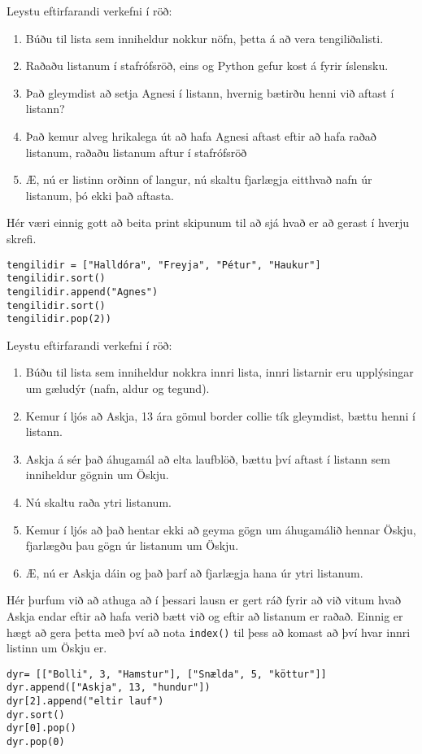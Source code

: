 \begin{exercise}\label{lst6}
Leystu eftirfarandi verkefni í röð:
\begin{enumerate}
	\item Búðu til lista sem inniheldur nokkur nöfn, þetta á að vera tengiliðalisti.
	\item Raðaðu listanum í stafrófsröð, eins og Python gefur kost á fyrir íslensku.
	\item Það gleymdist að setja Agnesi í listann, hvernig bætirðu henni við aftast í listann?
	\item Það kemur alveg hrikalega út að hafa Agnesi aftast eftir að hafa raðað listanum, raðaðu listanum aftur í stafrófsröð
	\item Æ, nú er listinn orðinn of langur, nú skaltu fjarlægja eitthvað nafn úr listanum, þó ekki það aftasta.
\end{enumerate}
\end{exercise}
\begin{Answer}[ref={lst6}]
Hér væri einnig gott að beita print skipunum til að sjá hvað er að gerast í hverju skrefi.
\begin{lstlisting}
tengilidir = ["Halldóra", "Freyja", "Pétur", "Haukur"]
tengilidir.sort()
tengilidir.append("Agnes")
tengilidir.sort()
tengilidir.pop(2))\end{lstlisting}
\end{Answer}

\begin{exercise}\label{lst7}
Leystu eftirfarandi verkefni í röð:
\begin{enumerate}
	\item Búðu til lista sem inniheldur nokkra innri lista, innri listarnir eru upplýsingar um gæludýr (nafn, aldur og tegund).
	\item Kemur í ljós að Askja, 13 ára gömul border collie tík gleymdist, bættu henni í listann.
	\item Askja á sér það áhugamál að elta laufblöð, bættu því aftast í listann sem inniheldur gögnin um Öskju.
	\item Nú skaltu raða ytri listanum.
	\item Kemur í ljós að það hentar ekki að geyma gögn um áhugamálið hennar Öskju, fjarlægðu þau gögn úr listanum um Öskju.
	\item Æ, nú er Askja dáin og það þarf að fjarlægja hana úr ytri listanum.
\end{enumerate}
\end{exercise}
\begin{Answer}[ref={lst7}]
Hér þurfum við að athuga að í þessari lausn er gert ráð fyrir að við vitum hvað Askja endar eftir að hafa verið bætt við og eftir að listanum er raðað.
Einnig er hægt að gera þetta með því að nota \texttt{index()} til þess að komast að því hvar innri listinn um Öskju er.
\begin{lstlisting}
dyr= [["Bolli", 3, "Hamstur"], ["Snælda", 5, "köttur"]]
dyr.append(["Askja", 13, "hundur"])
dyr[2].append("eltir lauf") 
dyr.sort()
dyr[0].pop()
dyr.pop(0)\end{lstlisting}
\end{Answer}